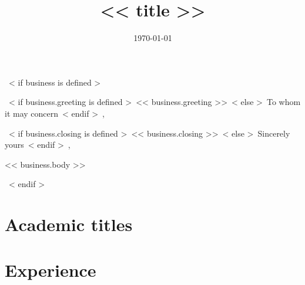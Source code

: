 \documentclass{moderncv}
\title{<< title >>}
\begin{document}
~< if business is defined >~
\date{\today}
\opening{~< if business.greeting is defined >~<< business.greeting >>~< else >~To whom it may concern~< endif >~,}
\closing{~< if business.closing is defined >~<< business.closing >>~< else >~Sincerely yours~< endif >~,}

\makelettertitle            %
<< business.body >>

\makeletterclosing          %
\newpage
\setcounter{page}{1}
~< endif >~
\maketitle
\section{Academic titles}
\newpage
\section{Experience}
\end{document}
